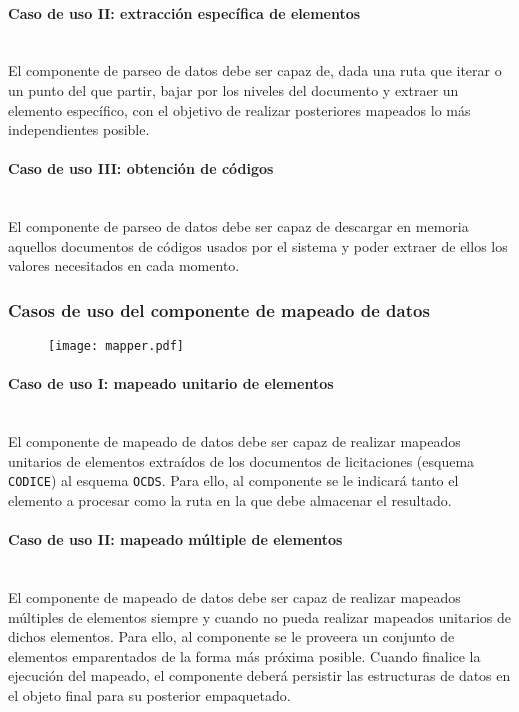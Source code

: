             \paragraph{Caso de uso II: extracción específica de elementos} \mbox{}\\
                El componente de parseo de datos debe ser capaz de, dada una ruta que iterar o un punto del que partir, bajar por los niveles del documento y extraer un elemento específico, con el objetivo de realizar posteriores mapeados lo más independientes posible.
            
            \paragraph{Caso de uso III: obtención de códigos} \mbox{}\\
                El componente de parseo de datos debe ser capaz de descargar en memoria aquellos documentos de códigos usados por el sistema y poder extraer de ellos los valores necesitados en cada momento.
                
        \subsubsection{Casos de uso del componente de mapeado de datos}
    
            \begin{figure}[h]
                \centering
                \texttt{[image: mapper.pdf]}
                \label{fig:mapper}
            \end{figure}
            
            \paragraph{Caso de uso I: mapeado unitario de elementos} \mbox{}\\
                El componente de mapeado de datos debe ser capaz de realizar mapeados unitarios de elementos extraídos de los documentos de licitaciones (esquema \texttt{CODICE}) al esquema \texttt{OCDS}. Para ello, al componente se le indicará tanto el elemento a procesar como la ruta en la que debe almacenar el resultado.
                
            \paragraph{Caso de uso II: mapeado múltiple de elementos} \mbox{}\\
                El componente de mapeado de datos debe ser capaz de realizar mapeados múltiples de elementos siempre y cuando no pueda realizar mapeados unitarios de dichos elementos. Para ello, al componente se le proveera un conjunto de elementos emparentados de la forma más próxima posible. Cuando finalice la ejecución del mapeado, el componente deberá persistir las estructuras de datos en el objeto final para su posterior empaquetado.
                
